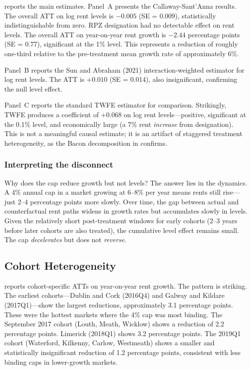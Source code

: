 \documentclass[12pt]{article}
\begin{document}
 reports the main estimates. Panel~A presents the Callaway-Sant'Anna results. The overall ATT on log rent levels is $-0.005$ (SE = 0.009), statistically indistinguishable from zero. RPZ designation had no detectable effect on rent levels. The overall ATT on year-on-year rent growth is $-2.44$ percentage points (SE = 0.77), significant at the 1\% level. This represents a reduction of roughly one-third relative to the pre-treatment mean growth rate of approximately 6\%.

Panel~B reports the Sun and Abraham (2021) interaction-weighted estimator for log rent levels. The ATT is $+0.010$ (SE = 0.014), also insignificant, confirming the null level effect.

Panel~C reports the standard TWFE estimator for comparison. Strikingly, TWFE produces a coefficient of $+0.068$ on log rent levels---positive, significant at the 0.1\% level, and economically large (a 7\% rent \textit{increase} from designation). This is not a meaningful causal estimate; it is an artifact of staggered treatment heterogeneity, as the Bacon decomposition in  confirms.




\subsubsection*{Interpreting the disconnect} Why does the cap reduce growth but not levels? The answer lies in the dynamics. A 4\% annual cap in a market growing at 6--8\% per year means rents still rise---just 2--4 percentage points more slowly. Over time, the gap between actual and counterfactual rent paths widens in growth rates but accumulates slowly in levels. Given the relatively short post-treatment windows for early cohorts (2--3 years before later cohorts are also treated), the cumulative level effect remains small. The cap \textit{decelerates} but does not \textit{reverse}.

\subsection{Cohort Heterogeneity}

 reports cohort-specific ATTs on year-on-year rent growth. The pattern is striking. The earliest cohorts---Dublin and Cork (2016Q4) and Galway and Kildare (2017Q1)---show the largest reductions, approximately 3.1 percentage points. These were the hottest markets where the 4\% cap was most binding. The September 2017 cohort (Louth, Meath, Wicklow) shows a reduction of 2.2 percentage points. Limerick (2018Q1) shows 3.2 percentage points. The 2019Q1 cohort (Waterford, Kilkenny, Carlow, Westmeath) shows a smaller and statistically insignificant reduction of 1.2 percentage points, consistent with less binding caps in lower-growth markets.
\end{document}
